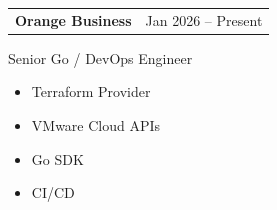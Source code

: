 \documentclass[10pt,a4paper]{article}
\begin{document}
\begin{experience}

\begin{tabularx}{\linewidth}{Xr}
\textbf{Orange Business} &
\textcolor{muted}{Jan 2026 -- Present}
\end{tabularx}

\textcolor{primary}{Senior Go / DevOps Engineer}

\vspace{4pt}

\begin{itemize}
\item Terraform Provider
\item VMware Cloud APIs
\item Go SDK
\item CI/CD
\end{itemize}

\end{experience}

\end{document}
